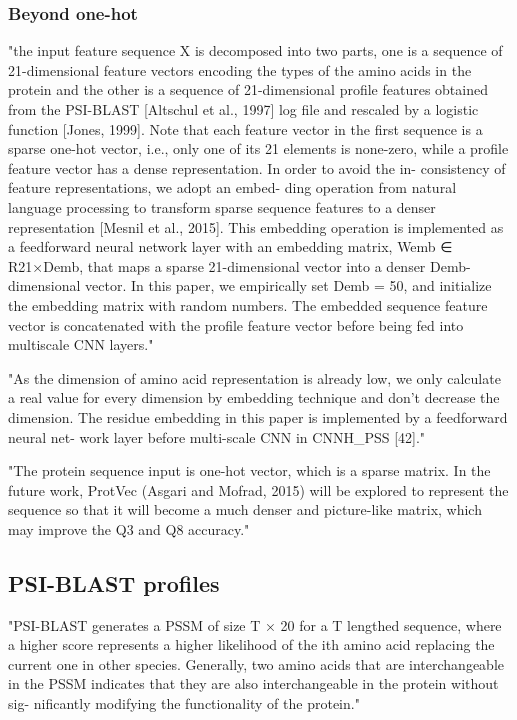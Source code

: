   \subsubsection{Beyond one-hot}
  "the input feature sequence X is decomposed into two parts, one is a sequence of 21-dimensional feature vectors encoding the types of the amino acids in the protein and the other is a sequence of 21-dimensional profile features obtained from the PSI-BLAST [Altschul et al., 1997] log file and rescaled by a logistic function [Jones, 1999]. Note that each feature vector in the first sequence is a sparse one-hot vector, i.e., only one of its 21 elements is none-zero, while a profile feature vector has a dense representation. In order to avoid the in- consistency of feature representations, we adopt an embed- ding operation from natural language processing to transform sparse sequence features to a denser representation [Mesnil et al., 2015]. This embedding operation is implemented as a feedforward neural network layer with an embedding matrix, Wemb ∈ R21×Demb, that maps a sparse 21-dimensional vector into a denser Demb-dimensional vector. In this paper, we empirically set Demb = 50, and initialize the embedding matrix with random numbers. The embedded sequence feature vector is concatenated with the profile feature vector before being fed into multiscale CNN layers." \cite{Li2016}

  "As the dimension of amino acid representation is already low, we only calculate a real value for every dimension by embedding technique and don’t decrease the dimension. The residue embedding in this paper is implemented by a feedforward neural net- work layer before multi-scale CNN in CNNH\_PSS [42]." \cite{Zhou2018}

  "The protein sequence input is one-hot vector, which is a sparse matrix. In the future work, ProtVec (Asgari and Mofrad, 2015) will be explored to represent the sequence so that it will become a much denser and picture-like matrix, which may improve the Q3 and Q8 accuracy." \cite{Fang2017}

 \subsection{PSI-BLAST profiles}
 "PSI-BLAST generates a PSSM of size T × 20 for a T lengthed sequence, where a higher score represents a higher likelihood of the ith amino acid replacing the current one in other species. Generally, two amino acids that are interchangeable in the PSSM indicates that they are also interchangeable in the protein without sig- nificantly modifying the functionality of the protein." \cite{Lin2016}

